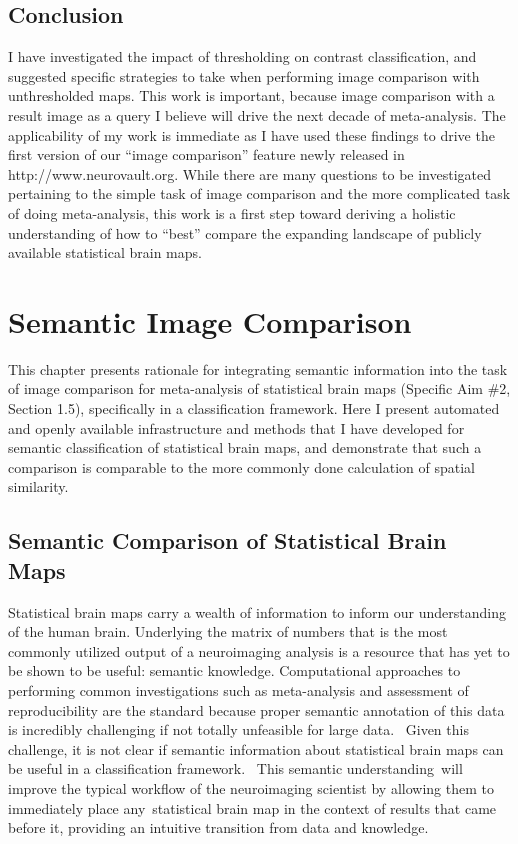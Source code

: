 \documentclass{report}
\begin{document}
\section{Conclusion}

I have investigated the impact of thresholding on contrast
classification, and suggested specific strategies to take when
performing image comparison with unthresholded maps. This work is
important, because image comparison with a result image as a query I
believe will drive the next decade of meta-analysis. The applicability
of my work is immediate as I have used these findings to drive the first
version of our ``image comparison'' feature newly released in
http://www.neurovault.org. While there are many questions to be
investigated pertaining to the simple task of image comparison and the
more complicated task of doing meta-analysis, this work is a first step
toward deriving a holistic understanding of how to ``best'' compare the
expanding landscape of publicly available statistical brain maps.

\chapter{Semantic Image Comparison}
This chapter presents rationale for integrating semantic information
into the task of image comparison for meta-analysis of statistical brain
maps (Specific Aim \#2, Section 1.5), specifically in a classification
framework. Here I present automated and openly available infrastructure
and methods that I have developed for semantic classification of
statistical brain maps, and demonstrate that such a comparison is
comparable to the more commonly done calculation of spatial similarity.

\section{Semantic Comparison of Statistical Brain Maps}

Statistical brain maps carry a wealth of information to inform our
understanding of the human brain. Underlying the matrix of numbers that
is the most commonly utilized output of a neuroimaging analysis is a
resource that has yet to be shown to be useful: semantic knowledge. Computational approaches to performing common investigations such as
meta-analysis and assessment of reproducibility are the standard because
proper semantic annotation of this data is incredibly challenging if not
totally unfeasible for large data. ~Given this challenge, it is not
clear if semantic information about statistical brain maps can be useful
in a classification framework. ~This semantic understanding~will improve
the typical workflow of the neuroimaging scientist by allowing them to
immediately place any~statistical brain map in the context of results
that came before it, providing an intuitive transition from data and
knowledge.
\end{document}

